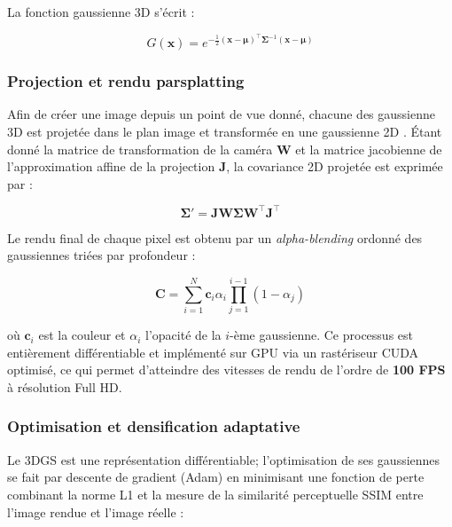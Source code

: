 La fonction gaussienne 3D s'écrit :

\begin{equation}
    G(\mathbf{x}) = e^{-\frac{1}{2}(\mathbf{x} - \boldsymbol{\mu})^\top 
    \boldsymbol{\Sigma}^{-1} (\mathbf{x} - \boldsymbol{\mu})}
    \label{eq:gaussian3d}
\end{equation}

\subsubsection{Projection et rendu parsplatting}

Afin de créer une image depuis un point de vue donné, chacune des gaussienne 3D est projetée dans le plan image et transformée en une gaussienne 2D . Étant donné la matrice de transformation de la caméra $\mathbf{W}$ et la matrice jacobienne de l'approximation affine de la projection $\mathbf{J}$, la covariance 2D projetée est exprimée par  :

\begin{equation}
    \boldsymbol{\Sigma}' = \mathbf{J}\mathbf{W}\boldsymbol{\Sigma}
    \mathbf{W}^\top\mathbf{J}^\top
    \label{eq:proj_cov}
\end{equation}

Le rendu final de chaque pixel est obtenu par un \textit{alpha-blending} 
ordonné des gaussiennes triées par profondeur :

\begin{equation}
    \mathbf{C} = \sum_{i=1}^{N} \mathbf{c}_i \alpha_i 
    \prod_{j=1}^{i-1}(1 - \alpha_j)
    \label{eq:alpha_blending}
\end{equation}

où $\mathbf{c}_i$ est la couleur et $\alpha_i$ l'opacité de la $i$-ème 
gaussienne. Ce processus est entièrement différentiable et implémenté sur 
GPU via un rastériseur CUDA optimisé, ce qui permet d'atteindre des vitesses 
de rendu de l'ordre de \textbf{100 FPS} à résolution Full HD.

\subsubsection{Optimisation et densification adaptative}

Le 3DGS est une représentation  différentiable; l'optimisation de ses  gaussiennes se fait par descente de gradient (Adam) en minimisant une fonction de perte combinant la norme  L1 et la mesure de la similarité perceptuelle SSIM  entre l'image rendue et l'image réelle :




